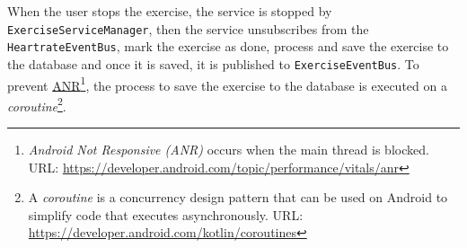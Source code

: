 When the user stops the exercise, the service is stopped by \verb;ExerciseServiceManager;, then the service unsubscribes from the \verb;HeartrateEventBus;, mark the exercise as done, process and save the exercise to the database and once it is saved, it is published to \verb;ExerciseEventBus;.
To prevent \url{ANR}\footnote{\emph{Android Not Responsive (ANR)} occurs when the main thread is blocked. URL: \url{https://developer.android.com/topic/performance/vitals/anr}}, the process to save the exercise to the database is executed on a \emph{coroutine}\footnote{A \emph{coroutine} is a concurrency design pattern that can be used on Android to simplify code that executes asynchronously. URL: \url{https://developer.android.com/kotlin/coroutines}}.
